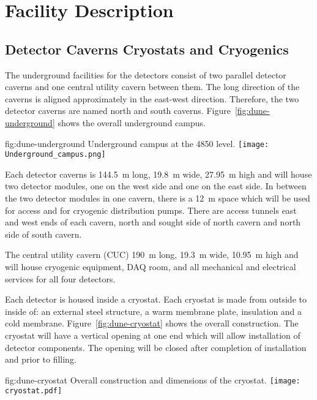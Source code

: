 \chapter{Facility Description}
\label{vl:tc-facility}

\section{Detector Caverns Cryostats and Cryogenics}
\label{sec:fdsp-coord-faci-caverns}

The underground facilities for the detectors consist of two parallel
detector caverns and one central utility cavern between them. The long
direction of the caverns is aligned approximately in the east-west
direction. Therefore, the two detector caverns are named north and
south caverns. Figure~\ref{fig:dune-underground} shows the overall
underground campus.
\begin{dunefigure}{fig:dune-underground}
  {Underground campus at the 4850 level.}
  \texttt{[image: Underground\_campus.png]}
\end{dunefigure}

Each detector caverns is \SI{144.5}{\meter} long, \SI{19.8}{\meter} wide,
\SI{27.95}{\meter} high and will house two detector modules, one on the
west side and one on the east side. In between the two detector
modules in one cavern, there is a \SI{12}{\meter} space which will be
used for access and for cryogenic distribution pumps. There are access
tunnels east and west ends of each cavern, north and sought side of
north cavern and north side of south cavern.

The central utility cavern (CUC) \SI{190}{\meter} long, \SI{19.3}{\meter}
wide, \SI{10.95}{\meter} high and will house cryogenic equipment, DAQ
room, and all mechanical and electrical services for all four
detectors.

Each detector is housed inside a cryostat. Each cryostat is made from
outside to inside of: an external steel structure, a warm membrane
plate, insulation and a cold membrane. Figure~\ref{fig:dune-cryostat}
shows the overall construction. The cryostat will have a vertical
opening at one end which will allow installation of detector
components. The opening will be closed after completion of
installation and prior to filling.
\begin{dunefigure}{fig:dune-cryostat}
  {Overall construction and dimensions of the  cryostat.}
  \texttt{[image: cryostat.pdf]}
\end{dunefigure}

